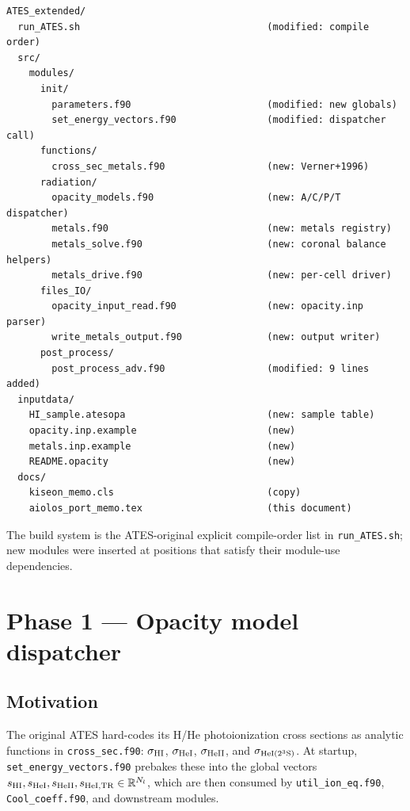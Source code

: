 \documentclass[english,a4paper]{kiseon_memo}
\begin{document}
\begin{verbatim}
ATES_extended/
  run_ATES.sh                                 (modified: compile order)
  src/
    modules/
      init/
        parameters.f90                        (modified: new globals)
        set_energy_vectors.f90                (modified: dispatcher call)
      functions/
        cross_sec_metals.f90                  (new: Verner+1996)
      radiation/
        opacity_models.f90                    (new: A/C/P/T dispatcher)
        metals.f90                            (new: metals registry)
        metals_solve.f90                      (new: coronal balance helpers)
        metals_drive.f90                      (new: per-cell driver)
      files_IO/
        opacity_input_read.f90                (new: opacity.inp parser)
        write_metals_output.f90               (new: output writer)
      post_process/
        post_process_adv.f90                  (modified: 9 lines added)
  inputdata/
    HI_sample.atesopa                         (new: sample table)
    opacity.inp.example                       (new)
    metals.inp.example                        (new)
    README.opacity                            (new)
  docs/
    kiseon_memo.cls                           (copy)
    aiolos_port_memo.tex                      (this document)
\end{verbatim}

The build system is the ATES-original explicit compile-order list in
\texttt{run\_ATES.sh}; new modules were inserted at positions that satisfy
their module-use dependencies.

\section{Phase 1 --- Opacity model dispatcher}

\subsection{Motivation}

The original ATES hard-codes its H/He photoionization cross sections as
analytic functions in \texttt{cross\_sec.f90}: $\sigma_{\rm HI}$,
$\sigma_{\rm HeI}$, $\sigma_{\rm HeII}$, and $\sigma_{\rm HeI(2^3S)}$. At
startup, \texttt{set\_energy\_vectors.f90} prebakes these into the global
vectors $s_{\rm HI}, s_{\rm HeI}, s_{\rm HeII}, s_{\rm HeI{,}TR} \in
\mathbb{R}^{N_l}$, which are then consumed by \texttt{util\_ion\_eq.f90},
\texttt{Cool\_coeff.f90}, and downstream modules.
\end{document}
